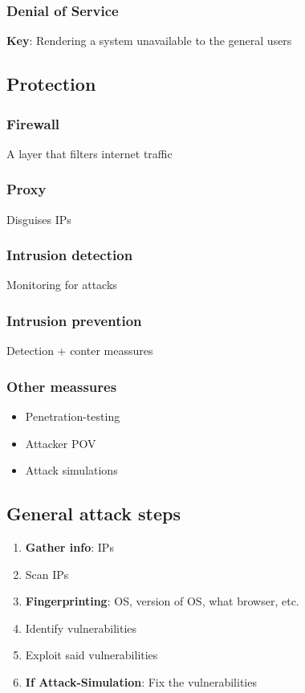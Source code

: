 \begin{flushleft}
\subsubsection{Denial of Service}
\textbf{Key}: Rendering a system unavailable to the general users

\subsection{Protection}
\subsubsection{Firewall}
A layer that filters internet traffic

\subsubsection{Proxy}
Disguises IPs

\subsubsection{Intrusion detection}
Monitoring for attacks

\subsubsection{Intrusion prevention}
Detection + conter meassures

\subsubsection{Other meassures}
\begin{itemize}
	\item Penetration-testing
	\item Attacker POV
	\item Attack simulations
\end{itemize}

\subsection{General attack steps}
\begin{enumerate}
	\item \textbf{Gather info}: IPs
	\item Scan IPs
	\item \textbf{Fingerprinting}: OS, version of OS, what browser, etc.
	\item Identify vulnerabilities
	\item Exploit said vulnerabilities
	\item \textbf{If Attack-Simulation}: Fix the vulnerabilities
\end{enumerate}
\end{flushleft}
